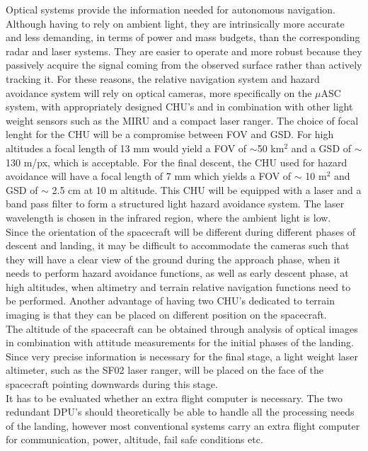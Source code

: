 \noindent
Optical systems provide the information needed for autonomous navigation. Although having to rely on ambient light, they are intrinsically more accurate and less demanding, in terms of power and mass budgets, than the corresponding radar and laser systems. They are easier to operate and more robust because they passively acquire the signal coming from the observed surface rather than actively tracking it. For these reasons, the relative navigation system and hazard avoidance system will rely on optical cameras, more specifically on the $\mu$ASC system, with appropriately designed CHU's and in combination with other light weight sensors such as the MIRU and a compact laser ranger. The choice of focal lenght for the CHU will be a compromise between FOV and GSD. For high altitudes a focal length of 13 mm would yield a FOV of $\sim$50 km$^2$ and a GSD of $\sim$130 m/px, which is acceptable. For the final descent, the CHU used for hazard avoidance will have a focal length of 7 mm which yields a FOV of $\sim$ 10 m$^2$ and GSD of $\sim$ 2.5 cm at 10 m altitude. This CHU will be equipped with a laser and a band pass filter to form a structured light hazard avoidance system. The laser wavelength is chosen in the infrared region, where the ambient light is low. \\

\noindent
Since the orientation of the spacecraft will be different during different phases of descent and landing, it may be difficult to accommodate the cameras such that they will have a clear view of the ground during the approach phase, when it needs to perform hazard avoidance functions, as well as early descent phase, at high altitudes, when altimetry and terrain relative navigation functions need to be performed. Another advantage of having two CHU's dedicated to terrain imaging is that they can be placed on different position on the spacecraft.\\

\noindent
The altitude of the spacecraft can be obtained through analysis of optical images in combination with attitude measurements for the initial phases of the landing. Since very precise information is necessary for the final stage, a light weight laser altimeter, such as the SF02 laser ranger, will be placed on the face of the spacecraft pointing downwards during this stage. \\

\noindent
It has to be evaluated whether an extra flight computer is necessary. The two redundant DPU's should theoretically be able to handle all the processing needs of the landing, however most conventional systems carry an extra flight computer for communication, power, altitude, fail safe conditions etc.\\

